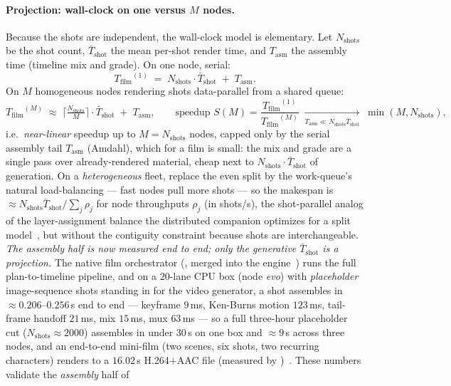 \documentclass[11pt]{article}
\newcommand{\Nshots}{\ensuremath{N_{\mathrm{shots}}}}
\newcommand{\Tshot}{\ensuremath{\bar{T}_{\mathrm{shot}}}}
\newcommand{\Tfilm}{\ensuremath{T_{\mathrm{film}}}}
\newcommand{\Tasm}{\ensuremath{T_{\mathrm{asm}}}}
\begin{document}
\paragraph{Projection: wall-clock on one versus $M$ nodes.} Because the shots are independent, the wall-clock
model is elementary. Let $\Nshots$ be the shot count, $\Tshot$ the mean per-shot render time, and $\Tasm$ the
assembly time (timeline mix and grade). On one node, serial:
\begin{equation}
\Tfilm^{(1)} \;=\; \Nshots\cdot\Tshot \;+\; \Tasm .
\label{eq:serial}
\end{equation}
On $M$ homogeneous nodes rendering shots data-parallel from a shared queue:
\begin{equation}
\Tfilm^{(M)} \;\approx\; \Big\lceil \tfrac{\Nshots}{M} \Big\rceil\cdot\Tshot \;+\; \Tasm ,
\qquad
\text{speedup } S(M)=\frac{\Tfilm^{(1)}}{\Tfilm^{(M)}} \;\xrightarrow[\Tasm\ll \Nshots\Tshot]{}\; \min(M,\Nshots),
\label{eq:parallel}
\end{equation}
i.e.\ \emph{near-linear} speedup up to $M=\Nshots$ nodes, capped only by the serial assembly tail $\Tasm$
(Amdahl), which for a film is small: the mix and grade are a single pass over already-rendered material, cheap
next to $\Nshots\cdot\Tshot$ of generation. On a \emph{heterogeneous} fleet, replace the even split by the
work-queue's natural load-balancing --- fast nodes pull more shots --- so the makespan is
$\approx \Nshots\Tshot / \sum_j \rho_j$ for node throughputs $\rho_j$ (in shots/s), the shot-parallel analog of
the layer-assignment balance the distributed companion optimizes for a split model~\cite{openproblems}, but
without the contiguity constraint because shots are interchangeable. \emph{The assembly half is now measured end to end; only the generative $\Tshot$ is a projection.} The native
film orchestrator (, merged into the engine~\cite{film}) runs the full plan-to-timeline
pipeline, and on a $20$-lane CPU box (node \emph{evo}) with \emph{placeholder} image-sequence shots standing in
for the video generator, a shot assembles in $\approx\!0.206$--$0.256$\,s end to end --- keyframe $9$\,ms,
Ken-Burns motion $123$\,ms, tail-frame handoff $21$\,ms, mix $15$\,ms, mux $63$\,ms --- so a full three-hour
placeholder cut ($\Nshots\!\approx\!2000$) assembles in under $30$\,s on one box and $\approx\!9$\,s across three
nodes, and an end-to-end mini-film (two scenes, six shots, two recurring characters) renders to a $16.02$\,s
H.264$+$AAC file (measured by )~\cite{film}. These numbers validate the \emph{assembly} half of
\end{document}
